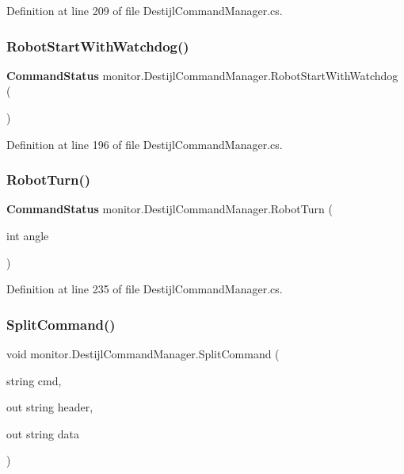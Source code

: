 Definition at line 209 of file Destijl\+Command\+Manager.\+cs.

\mbox{\label{classmonitor_1_1_destijl_command_manager_ade46aceeb79556e31fe632e9602e1636}} 
\subsubsection{Robot\+Start\+With\+Watchdog()}
{\footnotesize\ttfamily \textbf{ Command\+Status} monitor.\+Destijl\+Command\+Manager.\+Robot\+Start\+With\+Watchdog (\begin{DoxyParamCaption}{ }\end{DoxyParamCaption})}



Definition at line 196 of file Destijl\+Command\+Manager.\+cs.

\mbox{\label{classmonitor_1_1_destijl_command_manager_a3f7ee6f1803cfb8b2eb4290f9e9acced}} 
\subsubsection{Robot\+Turn()}
{\footnotesize\ttfamily \textbf{ Command\+Status} monitor.\+Destijl\+Command\+Manager.\+Robot\+Turn (\begin{DoxyParamCaption}\item[{int}]{angle }\end{DoxyParamCaption})}



Definition at line 235 of file Destijl\+Command\+Manager.\+cs.

\mbox{\label{classmonitor_1_1_destijl_command_manager_ad6fc73806e924e73dcf07c5cf3c81a66}} 
\subsubsection{Split\+Command()}
{\footnotesize\ttfamily void monitor.\+Destijl\+Command\+Manager.\+Split\+Command (\begin{DoxyParamCaption}\item[{string}]{cmd,  }\item[{out string}]{header,  }\item[{out string}]{data }\end{DoxyParamCaption})\hspace{0.3cm}{\ttfamily [private]}}



